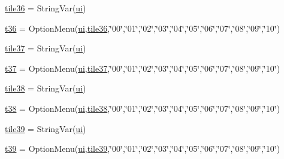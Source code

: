 \begin{DoxyCompactItemize}
\item 
\mbox{\hyperlink{namespacegui_a8bfddabdd4880420216fb021463971bf}{tile36}} = String\+Var(\mbox{\hyperlink{namespacegui_a40ab7281456eadbea2dc2038f5c24fa1}{ui}})
\item 
\mbox{\hyperlink{namespacegui_a7195c31f09afde2a7dc7dcacfdf6e2d8}{t36}} = Option\+Menu(\mbox{\hyperlink{namespacegui_a40ab7281456eadbea2dc2038f5c24fa1}{ui}},\mbox{\hyperlink{namespacegui_a8bfddabdd4880420216fb021463971bf}{tile36}},\char`\"{}00\char`\"{},\char`\"{}01\char`\"{},\char`\"{}02\char`\"{},\char`\"{}03\char`\"{},\char`\"{}04\char`\"{},\char`\"{}05\char`\"{},\char`\"{}06\char`\"{},\char`\"{}07\char`\"{},\char`\"{}08\char`\"{},\char`\"{}09\char`\"{},\char`\"{}10\char`\"{})
\item 
\mbox{\hyperlink{namespacegui_ade77e9bd0a3d48134f03d187fd954e11}{tile37}} = String\+Var(\mbox{\hyperlink{namespacegui_a40ab7281456eadbea2dc2038f5c24fa1}{ui}})
\item 
\mbox{\hyperlink{namespacegui_a13cff89f23ee08449bcf8be09c273998}{t37}} = Option\+Menu(\mbox{\hyperlink{namespacegui_a40ab7281456eadbea2dc2038f5c24fa1}{ui}},\mbox{\hyperlink{namespacegui_ade77e9bd0a3d48134f03d187fd954e11}{tile37}},\char`\"{}00\char`\"{},\char`\"{}01\char`\"{},\char`\"{}02\char`\"{},\char`\"{}03\char`\"{},\char`\"{}04\char`\"{},\char`\"{}05\char`\"{},\char`\"{}06\char`\"{},\char`\"{}07\char`\"{},\char`\"{}08\char`\"{},\char`\"{}09\char`\"{},\char`\"{}10\char`\"{})
\item 
\mbox{\hyperlink{namespacegui_abdae4a8ae6dac245e5f2874fb10bd3d9}{tile38}} = String\+Var(\mbox{\hyperlink{namespacegui_a40ab7281456eadbea2dc2038f5c24fa1}{ui}})
\item 
\mbox{\hyperlink{namespacegui_ad82b928eabe782933d61286e8d04f1a1}{t38}} = Option\+Menu(\mbox{\hyperlink{namespacegui_a40ab7281456eadbea2dc2038f5c24fa1}{ui}},\mbox{\hyperlink{namespacegui_abdae4a8ae6dac245e5f2874fb10bd3d9}{tile38}},\char`\"{}00\char`\"{},\char`\"{}01\char`\"{},\char`\"{}02\char`\"{},\char`\"{}03\char`\"{},\char`\"{}04\char`\"{},\char`\"{}05\char`\"{},\char`\"{}06\char`\"{},\char`\"{}07\char`\"{},\char`\"{}08\char`\"{},\char`\"{}09\char`\"{},\char`\"{}10\char`\"{})
\item 
\mbox{\hyperlink{namespacegui_ac73444c8a69cc21b256a72290397a012}{tile39}} = String\+Var(\mbox{\hyperlink{namespacegui_a40ab7281456eadbea2dc2038f5c24fa1}{ui}})
\item 
\mbox{\hyperlink{namespacegui_a4e686d2678f35f161517c3017479876a}{t39}} = Option\+Menu(\mbox{\hyperlink{namespacegui_a40ab7281456eadbea2dc2038f5c24fa1}{ui}},\mbox{\hyperlink{namespacegui_ac73444c8a69cc21b256a72290397a012}{tile39}},\char`\"{}00\char`\"{},\char`\"{}01\char`\"{},\char`\"{}02\char`\"{},\char`\"{}03\char`\"{},\char`\"{}04\char`\"{},\char`\"{}05\char`\"{},\char`\"{}06\char`\"{},\char`\"{}07\char`\"{},\char`\"{}08\char`\"{},\char`\"{}09\char`\"{},\char`\"{}10\char`\"{})

\end{DoxyCompactItemize}
